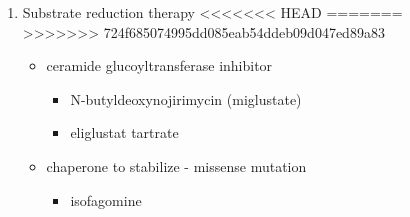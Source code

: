 \documentclass[fontsize=12pt]{scrartcl}
\begin{document}
\begin{enumerate}
\begin{enumerate}
\begin{enumerate}
\begin{enumerate}
\begin{table}[htbp]
\begin{enumerate}
\begin{enumerate}
\begin{table}[htbp]
\begin{figure}[htbp]
\begin{enumerate}
\begin{enumerate}
\item Substrate reduction therapy
<<<<<<< HEAD
\label{sec:org6a5bd71}
=======
\label{sec:orgde7a72b}
>>>>>>> 724f685074995dd085eab54ddeb09d047ed89a83
\begin{itemize}
\item ceramide glucoyltransferase inhibitor
\begin{itemize}
\item N-butyldeoxynojirimycin (miglustate)
\item eliglustat tartrate
\end{itemize}
\item chaperone to stabilize - missense mutation
\begin{itemize}
\item isofagomine
\end{itemize}
\end{itemize}
\end{enumerate}
\end{enumerate}


\end{figure}
\end{table}
\end{enumerate}
\end{enumerate}
\end{table}
\end{enumerate}
\end{enumerate}
\end{enumerate}
\end{enumerate}
\end{document}
